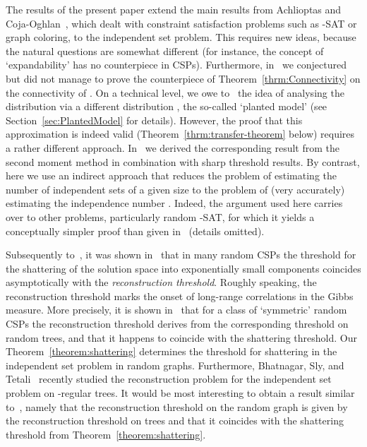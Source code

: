 \documentclass[a4paper,10pt]{article}
\newcommand\Thm{Theorem}
\newcommand\Sec{Section}
\begin{document}
The results of the present paper extend the main results from Achlioptas
and Coja-Oghlan~\cite{AchCoOg}, which dealt with constraint satisfaction
problems such as -SAT or graph coloring, to the independent set
problem. This requires new ideas, because the natural questions are
somewhat different (for instance, the concept of `expandability'
has no counterpiece in CSPs). Furthermore, in~\cite{AchCoOg} we
conjectured but did not manage to prove the counterpiece of
\Thm~\ref{thrm:Connectivity} on the connectivity of .
On a technical level, we owe to~\cite{AchCoOg} the idea of analysing
the distribution  via a different distribution ,
the so-called `planted model' (see \Sec~\ref{sec:PlantedModel}
for details). However, the proof that this approximation is indeed
valid (\Thm~\ref{thrm:transfer-theorem} below) requires a rather
different approach. In~\cite{AchCoOg} we derived the corresponding
result from the second moment method in combination with sharp
threshold results. By contrast, here we use an indirect approach
that reduces the problem of estimating the number 
of independent sets of a given size to the problem of (very accurately)
estimating the independence number . Indeed, the
argument used here carries over to other problems, particularly
random -SAT, for which it yields a conceptually simpler proof
than given in~\cite{AchCoOg} (details omitted).

Subsequently to~\cite{AchCoOg}, it was shown in~\cite{MRT} that
in many random CSPs the threshold for the shattering of the solution
space into exponentially small components coincides asymptotically
with the \emph{reconstruction threshold}. Roughly speaking, the
reconstruction threshold marks the onset of long-range correlations
in the Gibbs measure. More precisely, it is shown in~\cite{MRT} that
for a class of `symmetric' random CSPs the reconstruction threshold
derives from the corresponding threshold on random trees, and that
it happens to coincide with the shattering threshold. Our
\Thm~\ref{theorem:shattering} determines the threshold for shattering
in the independent set problem in random graphs. Furthermore,
Bhatnagar, Sly, and Tetali~\cite{BST10} recently studied the
reconstruction problem for the independent set problem on -regular
trees. It would be most interesting to obtain a result
similar to~\cite{MRT}, namely that the reconstruction threshold
on the  random graph is given by the reconstruction threshold
on trees and that it coincides with the shattering threshold from
\Thm~\ref{theorem:shattering}.
\end{document}
